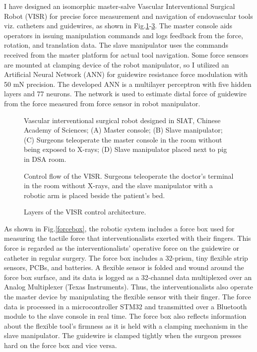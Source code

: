 \documentclass[
    ngerman,american
    ]{scrartcl}
\begin{document}
I have designed an isomorphic master-salve Vascular Interventional Surgical Robot (VISR) for precise force measurement and navigation of endovascular tools viz. catheters and guidewires, as shown in Fig.\ref{VISR}-\ref{architecture1}. The master console aids operators in issuing manipulation commands and logs feedback from the force, rotation, and translation data. The slave manipulator uses the commands received from the master platform for actual tool navigation. Some force sensors are mounted at clamping device of the robot manipulator, so I utilized an Artificial Neural Network (ANN) for guidewire resistance force modulation with 50 mN precision. The developed ANN is a multilayer perceptron with five hidden layers and 77 neurons. The network is used to estimate distal force of guidewire from the force measured from force sensor in robot manipulator. 

\begin{figure}[H]
	\caption{Vascular interventional surgical robot designed in SIAT, Chinese Academy of Sciences; (A) Master console; (B) Slave manipulator; (C) Surgeons teleoperate the master console in the room without being exposed to X-rays; (D) Slave manipulator placed next to pig in DSA room.}
	\label{VISR}
\end{figure}   


\begin{figure}[H]
	\caption{Control flow of the VISR. Surgeons teleoperate the doctor’s terminal in the room without
		X-rays, and the slave manipulator with a robotic arm is placed beside the patient’s bed.}
	\label{control_flow}
\end{figure}


\begin{figure}[H]
	\caption{Layers of the VISR control architecture.}
	\label{architecture1}
\end{figure}


As shown in Fig.\ref{forcebox}, the robotic system includes a force box used for measuring the
tactile force that interventionalists exerted with their fingers. This force is regarded as the
interventionalists’ operative force on the guidewire or catheter in regular surgery. The force box includes a 32-prism, tiny flexible strip sensors, PCBs, and batteries. A flexible
sensor is folded and wound around the force box surface, and its data is logged as a
32-channel data multiplexed over an Analog Multiplexer (Texas Instruments). Thus, the interventionalists also operate the master device by manipulating the
flexible sensor with their finger. The force data is processed in a microcontroller STM32
 and transmitted over a Bluetooth module to the slave console in real time. The force box also reflects
information about the flexible tool’s firmness as it is held with a clamping mechanism in
the slave manipulator. The guidewire is clamped tightly when the surgeon presses hard on
the force box and vice versa.
\end{document}
